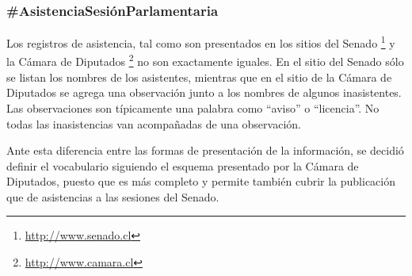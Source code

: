 \subsubsection{\#AsistenciaSesiónParlamentaria}

Los registros de asistencia, tal como son presentados en los
sitios del Senado \footnote{\url{http://www.senado.cl}} y la Cámara de
Diputados \footnote{\url{http://www.camara.cl}} no son exactamente
iguales. En el sitio del Senado sólo se listan los nombres de los
asistentes, mientras que en el sitio de la Cámara de Diputados se
agrega una observación junto a los nombres de algunos
inasistentes. Las observaciones son típicamente una palabra como
``aviso'' o ``licencia''. No todas las inasistencias van acompañadas
de una observación.

Ante esta diferencia entre las formas de presentación de la
información, se decidió definir el vocabulario siguiendo el esquema
presentado por la Cámara de Diputados, puesto que es más completo y
permite también cubrir la publicación que de asistencias a las
sesiones del Senado.

\begin{description}
  
\end{description}
